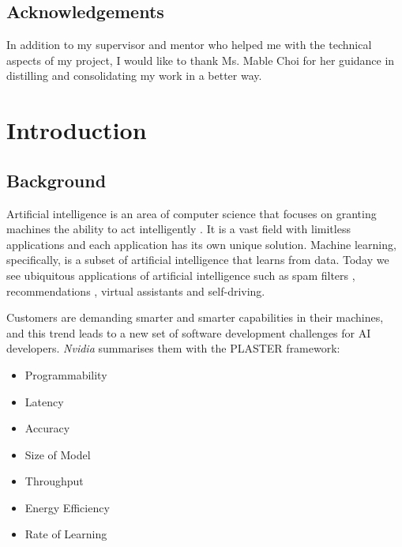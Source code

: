 \documentclass{report}
\def\mainmatter{%
    \pagenumbering{arabic}
    \setcounter{page}{1}
    \setcounter{section}{0}
    \renewcommand{\thesection}{\thechapter.\arabic{section}}
}%
\begin{document}
\section*{Acknowledgements}
In addition to my supervisor and mentor who helped me with the technical aspects of my project, I would like to thank Ms. Mable Choi for her guidance in distilling and consolidating my work in a better way.

\setcounter{page}{2}
\tableofcontents

\newpage
{}
\listoffigures

\newpage
{}
\listoftables

\newpage
\mainmatter

\chapter{Introduction}

\section{Background}
Artificial intelligence is an area of computer science that focuses on granting machines the ability to act intelligently \cite{McCarthy2007}.
It is a vast field with limitless applications and each application has its own unique solution.
Machine learning, specifically, is a subset of artificial intelligence that learns from data. \cite{Mitchell1997}
Today we see ubiquitous applications of artificial intelligence such as spam filters \cite{Androutsopoulos2000},  recommendations \cite{lekakos2008hybrid}, virtual assistants and self-driving.

Customers are demanding smarter and smarter capabilities in their machines, and this trend leads to a new set of software development challenges for AI developers. \textit{Nvidia} summarises them with the PLASTER \cite{Teich2018} framework:
\begin{itemize}
  \item Programmability
  \item Latency
  \item Accuracy
  \item Size of Model
  \item Throughput
  \item Energy Efficiency
  \item Rate of Learning
\end{itemize}
\end{document}
